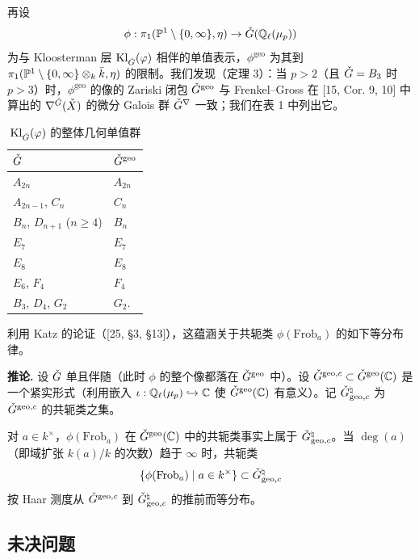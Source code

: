 再设
\[
\phi:\pi_1(\mathbb{P}^1\setminus\{0,\infty\},\eta)\to\check G(\mathbb{Q}_\ell(\mu_p))
\]
为与 Kloosterman 层 $\mathrm{Kl}_{\check G}(\varphi)$ 相伴的单值表示，$\phi^{\mathrm{geo}}$ 为其到 $\pi_1(\mathbb{P}^1\setminus\{0,\infty\}\otimes_k\bar k,\eta)$ 的限制。我们发现（定理 3）：当 $p>2$（且 $\check G=B_3$ 时 $p>3$）时，$\phi^{\mathrm{geo}}$ 的像的 Zariski 闭包 $\check G^{\mathrm{geo}}$ 与 Frenkel--Gross 在 [15, Cor. 9, 10] 中算出的 $\nabla^{\check G}(\check X)$ 的微分 Galois 群 $\check G^{\nabla}$ 一致；我们在表 1 中列出它。

\begin{table}[htbp]
\centering
\small
\caption{$\mathrm{Kl}_{\check G}(\varphi)$ 的整体几何单值群}\label{tab:1}
\begin{tabular}{@{}ll@{}}
\toprule
$\check G$ & $\check G^{\mathrm{geo}}$\\
\midrule
$A_{2n}$ & $A_{2n}$\\
$A_{2n-1}$, $C_n$ & $C_n$\\
$B_n$, $D_{n+1}$ ($n\ge4$) & $B_n$\\
$E_7$ & $E_7$\\
$E_8$ & $E_8$\\
$E_6$, $F_4$ & $F_4$\\
$B_3$, $D_4$, $G_2$ & $G_2$.\\
\bottomrule
\end{tabular}
\end{table}

利用 Katz 的论证（[25, §3, §13]），这蕴涵关于共轭类 $\phi(\mathrm{Frob}_a)$ 的如下等分布律。

\medskip
\noindent\textbf{推论.} 设 $\check G$ 单且伴随（此时 $\phi$ 的整个像都落在 $\check G^{\mathrm{geo}}$ 中）。设 $\check G^{\mathrm{geo},c}\subset\check G^{\mathrm{geo}}(\mathbb{C})$ 是一个紧实形式（利用嵌入 $\iota:\mathbb{Q}_\ell(\mu_p)\hookrightarrow\mathbb{C}$ 使 $\check G^{\mathrm{geo}}(\mathbb{C})$ 有意义）。记 $\check G^{\natural}_{\mathrm{geo},c}$ 为 $\check G^{\mathrm{geo},c}$ 的共轭类之集。

对 $a\in k^\times$，$\phi(\mathrm{Frob}_a)$ 在 $\check G^{\mathrm{geo}}(\mathbb{C})$ 中的共轭类事实上属于 $\check G^{\natural}_{\mathrm{geo},c}$。当 $\deg(a)$（即域扩张 $k(a)/k$ 的次数）趋于 $\infty$ 时，共轭类
\[
\{\phi(\mathrm{Frob}_a)\mid a\in k^\times\}\subset\check G^{\natural}_{\mathrm{geo},c}
\]
按 Haar 测度从 $\check G^{\mathrm{geo},c}$ 到 $\check G^{\natural}_{\mathrm{geo},c}$ 的推前而等分布。
\medskip

\subsection{未决问题}

